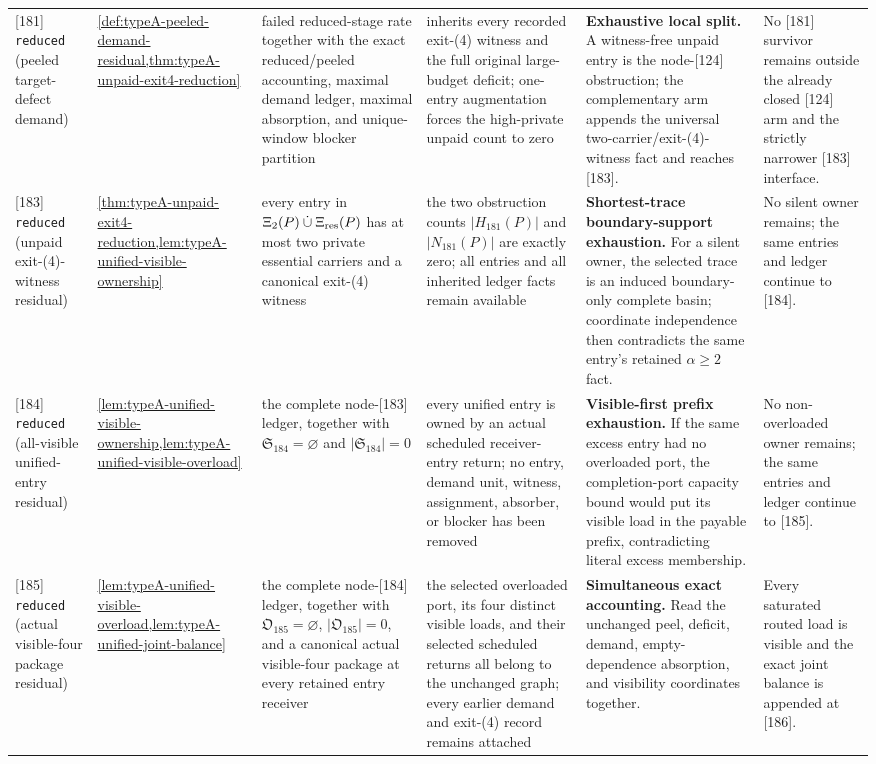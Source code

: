 \documentclass[11pt]{article}
\begin{document}
{\begin{longtable}{L{0.09\textwidth} L{0.095\textwidth} L{0.15\textwidth} L{0.08\textwidth} L{0.105\textwidth} L{0.335\textwidth}}
{[181]} \texttt{reduced} (peeled target-defect demand) & \cref{def:typeA-peeled-demand-residual,thm:typeA-unpaid-exit4-reduction} & failed reduced-stage rate together with the exact reduced/peeled accounting, maximal demand ledger, maximal absorption, and unique-window blocker partition & inherits every recorded exit-(4) witness and the full original large-budget deficit; one-entry augmentation forces the high-private unpaid count to zero & \textbf{Exhaustive local split.} A witness-free unpaid entry is the node-[124] obstruction; the complementary arm appends the universal two-carrier/exit-(4)-witness fact and reaches [183]. & No [181] survivor remains outside the already closed [124] arm and the strictly narrower [183] interface. \\
{[183]} \texttt{reduced} (unpaid exit-\textup{(4)}-witness residual) & \cref{thm:typeA-unpaid-exit4-reduction,lem:typeA-unified-visible-ownership} & every entry in \(\Xi_2(P)\mathbin{\dot\cup}\Xi_{\rm res}(P)\) has at most two private essential carriers and a canonical exit-\textup{(4)} witness & the two obstruction counts \(\lvert H_{181}(P)\rvert\) and \(\lvert N_{181}(P)\rvert\) are exactly zero; all entries and all inherited ledger facts remain available & \textbf{Shortest-trace boundary-support exhaustion.} For a silent owner, the selected trace is an induced boundary-only complete basin; coordinate independence then contradicts the same entry's retained \(\alpha\ge2\) fact. & No silent owner remains; the same entries and ledger continue to [184]. \\
{[184]} \texttt{reduced} (all-visible unified-entry residual) & \cref{lem:typeA-unified-visible-ownership,lem:typeA-unified-visible-overload} & the complete node-[183] ledger, together with \(\mathfrak S_{184}=\varnothing\) and \(|\mathfrak S_{184}|=0\) & every unified entry is owned by an actual scheduled receiver-entry return; no entry, demand unit, witness, assignment, absorber, or blocker has been removed & \textbf{Visible-first prefix exhaustion.} If the same excess entry had no overloaded port, the completion-port capacity bound would put its visible load in the payable prefix, contradicting literal excess membership. & No non-overloaded owner remains; the same entries and ledger continue to [185]. \\
{[185]} \texttt{reduced} (actual visible-four package residual) & \cref{lem:typeA-unified-visible-overload,lem:typeA-unified-joint-balance} & the complete node-[184] ledger, together with \(\mathfrak O_{185}=\varnothing\), \(|\mathfrak O_{185}|=0\), and a canonical actual visible-four package at every retained entry receiver & the selected overloaded port, its four distinct visible loads, and their selected scheduled returns all belong to the unchanged graph; every earlier demand and exit-\textup{(4)} record remains attached & \textbf{Simultaneous exact accounting.} Read the unchanged peel, deficit, demand, empty-dependence absorption, and visibility coordinates together. & Every saturated routed load is visible and the exact joint balance is appended at [186]. \\

\end{longtable}}
\end{document}

